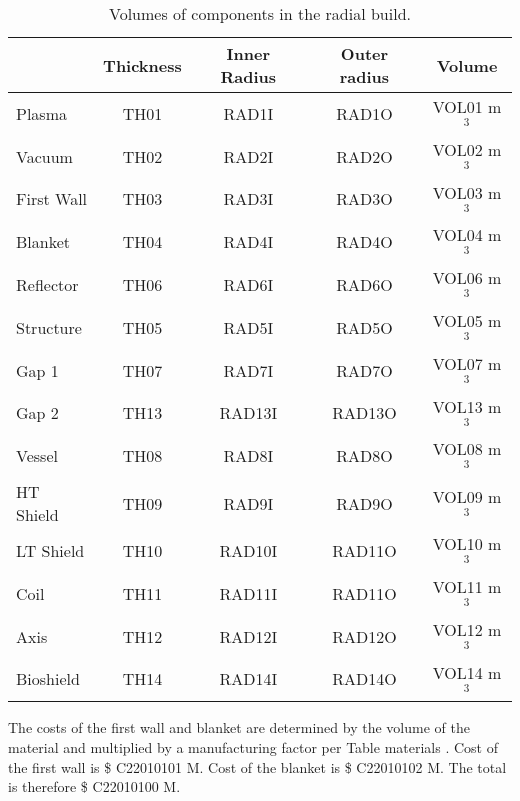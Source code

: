 \begin{table}[h!]
    \centering
    \begin{tabular}{l c  c c c}
        \hline
        &	Thickness	&	Inner Radius	&	Outer radius	&	Volume		\\
        \hline
        Plasma	&	TH01	&	RAD1I	&	RAD1O	&	VOL01	m$^{3}$	\\
        Vacuum	&	TH02	&	RAD2I	&	RAD2O	&	VOL02	m$^{3}$	\\
        First Wall	&	TH03	&	RAD3I	&	RAD3O	&	VOL03	m$^{3}$	\\
        Blanket	&	TH04	&	RAD4I	&	RAD4O	&	VOL04	m$^{3}$	\\
        Reflector	&	TH06	&	RAD6I	&	RAD6O	&	VOL06	m$^{3}$	\\
        Structure	&	TH05	&	RAD5I	&	RAD5O	&	VOL05	m$^{3}$	\\
        Gap	1 &	TH07	&	RAD7I	&	RAD7O	&	VOL07	m$^{3}$	\\
        Gap 2	&	TH13	&	RAD13I	&	RAD13O	&	VOL13	m$^{3}$	\\
        Vessel	&	TH08	&	RAD8I	&	RAD8O	&	VOL08	m$^{3}$	\\
        HT Shield	&	TH09	&	RAD9I	&	RAD9O	&	VOL09	m$^{3}$	\\
        LT Shield	&	TH10	&	RAD10I	&	RAD11O	&	VOL10	m$^{3}$	\\
        Coil	&	TH11	&	RAD11I	&	RAD11O	&	VOL11	m$^{3}$	\\
        Axis	&	TH12	&	RAD12I	&	RAD12O	&	VOL12	m$^{3}$	\\
        Bioshield	&	TH14	&	RAD14I	&	RAD14O	&	VOL14	m$^{3}$	\\
        \hline
    \end{tabular}
    \caption{Volumes of components in the radial build.}
    \label{tab:volumes}
\end{table}




The costs of the first wall and blanket are determined by the volume of the material and multiplied by a manufacturing factor per Table materials
.   Cost of the first wall is \$ C22010101 M.  Cost of the blanket is \$ C22010102 M. The total is therefore \$ C22010100 M.

